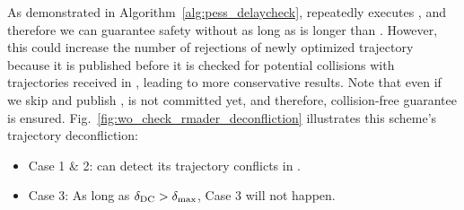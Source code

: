 As demonstrated in Algorithm~\ref{alg:pess_delaycheck}, \DCStep{} repeatedly executes \CheckStep{}, and therefore we can guarantee safety without \CheckStep{} as long as \DCStep{} is longer than \delayActualMax{}. However, this could increase the number of rejections of newly optimized trajectory because it is published before it is checked for potential collisions with trajectories received in \OStep, leading to more conservative results.
Note that even if we skip \CheckStep{} and publish \trajNew{}, \trajNew{} is not committed yet, and therefore, collision-free guarantee is ensured. Fig.~\ref{fig:wo_check_rmader_deconfliction} illustrates this scheme's trajectory deconfliction: 
\begin{itemize}
    \item Case 1 \& 2: \AgentB{} can detect its trajectory conflicts in \DCStepB.
    \item Case 3: As long as $\delta_\text{DC}{}>\delta_\text{max}{}$, Case 3 will not happen.
\end{itemize}


